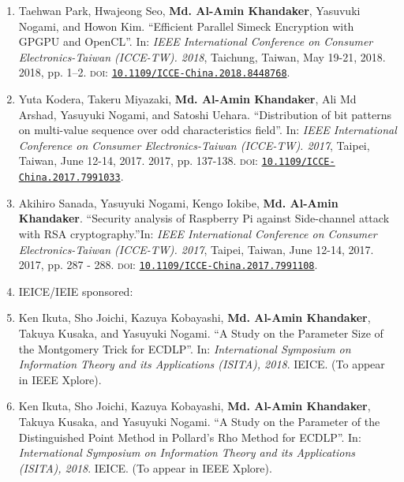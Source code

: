 \begin{enumerate}
   	\item Taehwan Park, Hwajeong Seo, \textbf{Md. Al-Amin Khandaker}, Yasuvuki Nogami, and Howon Kim. ``Efficient Parallel Simeck Encryption with GPGPU and OpenCL''. In: \textit{IEEE International Conference on Consumer Electronics-Taiwan (ICCE-TW). 2018}, Taichung, Taiwan, May 19-21, 2018. 2018, pp. 1–2. \textsc{doi}: \href{https://doi.org/10.1109/ICCE-China.2018.8448768}{\texttt{10.1109/ICCE-China.2018.8448768}}.
   	
   	\item Yuta Kodera, Takeru Miyazaki, \textbf{Md. Al-Amin Khandaker}, Ali Md Arshad, Yasuyuki Nogami, and Satoshi Uehara. ``Distribution of bit patterns on multi-value sequence over odd characteristics field''.  In: \textit{IEEE International Conference on Consumer Electronics-Taiwan (ICCE-TW). 2017}, Taipei, Taiwan, June 12-14, 2017. 2017, pp. 137-138. \textsc{doi}: \href{https://doi.org/10.1109/ICCE-China.2017.7991033}{\texttt{10.1109/ICCE-\\China.2017.7991033}}.	
   
	\item Akihiro Sanada, Yasuyuki Nogami, Kengo Iokibe, \textbf{Md. Al-Amin Khandaker}. ``Security analysis of Raspberry Pi against Side-channel attack with RSA cryptography.''In: \textit{IEEE International Conference on Consumer Electronics-Taiwan (ICCE-TW). 2017}, Taipei, Taiwan, June 12-14, 2017. 2017, pp. 287 - 288. \textsc{doi}: \href{https://doi.org/10.1109/ICCE-China.2017.7991108}{\texttt{10.1109/ICCE-China.2017.7991108}}.	
	
		\vspace{5mm}
	\item[ ] \Large IEICE/IEIE sponsored:
	\normalsize
	\item Ken Ikuta, Sho Joichi, Kazuya Kobayashi, \textbf{Md. Al-Amin Khandaker}, Takuya Kusaka, and Yasuyuki Nogami. ``A Study on the Parameter Size of the Montgomery Trick for ECDLP''. In: \textit{International Symposium on Information Theory and its Applications (ISITA), 2018}. IEICE. (To appear in IEEE Xplore).
	
	\item Ken Ikuta, Sho Joichi, Kazuya Kobayashi, \textbf{Md. Al-Amin Khandaker}, Takuya Kusaka, and Yasuyuki Nogami. ``A Study on the Parameter of the Distinguished Point Method in Pollard's Rho Method for ECDLP''. In: \textit{International Symposium on Information Theory and its Applications (ISITA), 2018}. IEICE. (To appear in IEEE Xplore).	
	

\end{enumerate}
